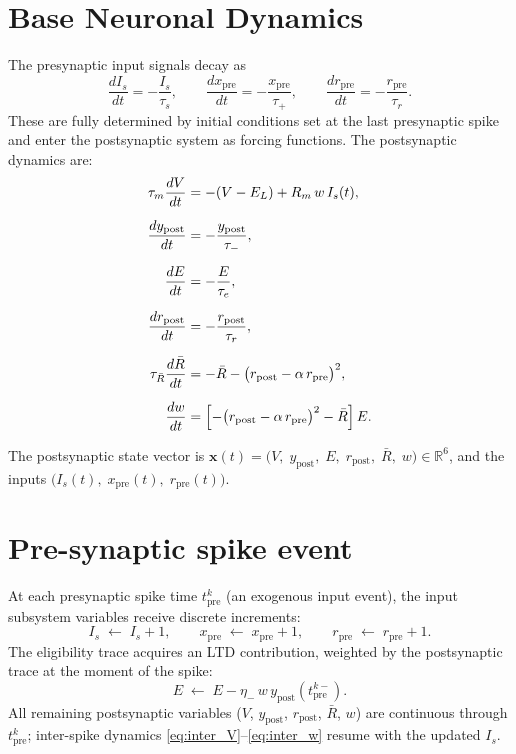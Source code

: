\documentclass[11pt]{article}
\theoremstyle{plain}
\theoremstyle{definition}
\begin{document}
\section{Base Neuronal Dynamics} \label{sec:interspike}

The presynaptic input signals decay as
\[
    \frac{dI_s}{dt} = -\frac{I_s}{\tau_s}, \qquad
    \frac{dx_{\mathrm{pre}}}{dt} = -\frac{x_{\mathrm{pre}}}{\tau_+}, \qquad
    \frac{dr_{\mathrm{pre}}}{dt} = -\frac{r_{\mathrm{pre}}}{\tau_r}.
\]
These are fully determined by initial conditions set at the last presynaptic spike and enter the postsynaptic system as forcing functions. The postsynaptic dynamics are:
\begin{align}
    \tau_m \frac{dV}{dt} &= -(V - E_L) + R_m\, w\, I_s(t), \label{eq:inter_V} \\[6pt]
    \frac{dy_{\mathrm{post}}}{dt} &= -\frac{y_{\mathrm{post}}}{\tau_-}, \label{eq:inter_ypost} \\[6pt]
    \frac{dE}{dt} &= -\frac{E}{\tau_e}, \label{eq:inter_E} \\[6pt]
    \frac{dr_{\mathrm{post}}}{dt} &= -\frac{r_{\mathrm{post}}}{\tau_r}, \label{eq:inter_rpost} \\[6pt]
    \tau_{\bar{R}} \frac{d\bar{R}}{dt} &= -\bar{R} - \bigl(r_{\mathrm{post}} - \alpha\, r_{\mathrm{pre}}\bigr)^2, \label{eq:inter_Rbar} \\[6pt]
    \frac{dw}{dt} &= \Bigl[-\bigl(r_{\mathrm{post}} - \alpha\, r_{\mathrm{pre}}\bigr)^2 - \bar{R}\Bigr]\, E. \label{eq:inter_w}
\end{align}

The postsynaptic state vector is $\mathbf{x}(t) = \bigl(V,\; y_{\mathrm{post}},\; E,\; r_{\mathrm{post}},\; \bar{R},\; w\bigr) \in \mathbb{R}^6$, and the inputs $\bigl(I_s(t),\; x_{\mathrm{pre}}(t),\; r_{\mathrm{pre}}(t)\bigr)$.

\section{Pre-synaptic spike event} \label{sec:pre-spike}

At each presynaptic spike time $t_{\mathrm{pre}}^k$ (an exogenous input event), the input subsystem variables receive discrete increments:
\[
    I_s \;\leftarrow\; I_s + 1, \qquad
    x_{\mathrm{pre}} \;\leftarrow\; x_{\mathrm{pre}} + 1, \qquad
    r_{\mathrm{pre}} \;\leftarrow\; r_{\mathrm{pre}} + 1.
\]
The eligibility trace acquires an LTD contribution, weighted by the postsynaptic trace at the moment of the spike:
\[
    E \;\leftarrow\; E - \eta_-\, w\, y_{\mathrm{post}}(t_{\mathrm{pre}}^{k-}).
\]
All remaining postsynaptic variables ($V$, $y_{\mathrm{post}}$, $r_{\mathrm{post}}$, $\bar{R}$, $w$) are continuous through $t_{\mathrm{pre}}^k$; inter-spike dynamics \eqref{eq:inter_V}--\eqref{eq:inter_w} resume with the updated $I_s$.
\end{document}
